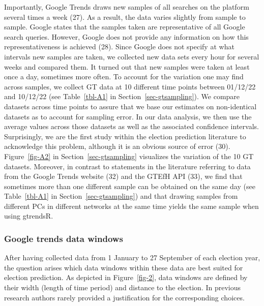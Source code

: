 \documentclass[
  letterpaper,
  DIV=11,
  numbers=noendperiod]{scrartcl}
\begin{document}
Importantly, Google Trends draws new samples of all searches on the
platform several times a week (27). As a result, the data varies
slightly from sample to sample. Google states that the samples taken are
representative of all Google search queries. However, Google does not
provide any information on how this representativeness is achieved (28).
Since Google does not specify at what intervals new samples are taken,
we collected new data sets every hour for several weeks and compared
them. It turned out that new samples were taken at least once a day,
sometimes more often. To account for the variation one may find across
samples, we collect GT data at 10 different time points between 01/12/22
and 10/12/22 (see Table~\ref{tbl-A1} in Section~\ref{sec-gtsampling}).
We compare datasets across time points to assure that we base our
estimates on non-identical datasets as to account for sampling error. In
our data analysis, we then use the average values across those datasets
as well as the associated confidence intervals. Surprisingly, we are the
first study within the election prediction literature to acknowledge
this problem, although it is an obvious source of error (30).
Figure~\ref{fig-A2} in Section~\ref{sec-gtsampling} visualizes the
variation of the 10 GT datasets. Moreover, in contrast to statements in
the literature referring to data from the Google Trends website (32) and
the GTEfH API (33), we find that sometimes more than one different
sample can be obtained on the same day (see Table~\ref{tbl-A1} in
Section~\ref{sec-gtsampling}) and that drawing samples from different
PCs in different networks at the same time yields the same sample when
using gtrendsR.

\hypertarget{google-trends-data-windows}{%
\subsubsection{Google trends data
windows}\label{google-trends-data-windows}}

After having collected data from 1 January to 27 September of each
election year, the question arises which data windows within these data
are best suited for election prediction. As depicted in
Figure~\ref{fig-2}, data windows are defined by their width (length of
time period) and distance to the election. In previous research authors
rarely provided a justification for the corresponding choices.
\end{document}
